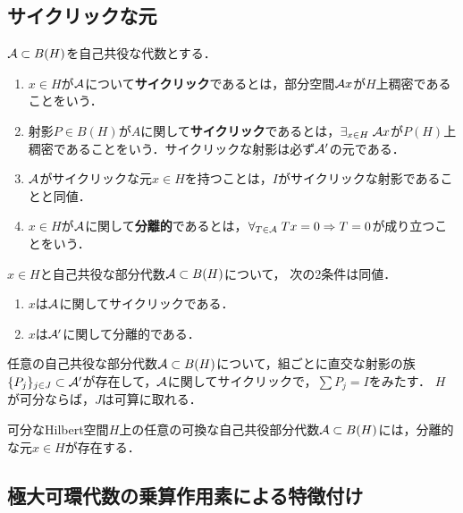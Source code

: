 \documentclass[uplatex,dvipdfmx]{jsreport}
\begin{document}
\subsection{サイクリックな元}

\begin{definition}
    $\mathcal{A}\subset B(H)$を自己共役な代数とする．
    \begin{enumerate}
        \item $x\in H$が$\mathcal{A}$について\textbf{サイクリック}であるとは，部分空間$\mathcal{A} x$が$H$上稠密であることをいう．
        \item 射影$P\in B(H)$が$A$に関して\textbf{サイクリック}であるとは，$\exists_{x\in H}\;\mathcal{A} x$が$P(H)$上稠密であることをいう．サイクリックな射影は必ず$\mathcal{A}'$の元である．
        \item $\mathcal{A}$がサイクリックな元$x\in H$を持つことは，$I$がサイクリックな射影であることと同値．
        \item $x\in H$が$\mathcal{A}$に関して\textbf{分離的}であるとは，$\forall_{T\in\mathcal{A}}\;Tx=0\Rightarrow T=0$が成り立つことをいう．
    \end{enumerate}
\end{definition}

\begin{lemma}
    $x\in H$と自己共役な部分代数$\mathcal{A}\subset B(H)$について，
    次の2条件は同値．
    \begin{enumerate}
        \item $x$は$\mathcal{A}$に関してサイクリックである．
        \item $x$は$\mathcal{A}'$に関して分離的である．
    \end{enumerate}
\end{lemma}

\begin{lemma}
    任意の自己共役な部分代数$\mathcal{A}\subset B(H)$について，組ごとに直交な射影の族$\{P_j\}_{j\in J}\subset\mathcal{A}'$が存在して，$\mathcal{A}$に関してサイクリックで，$\sum P_j=I$をみたす．
    $H$が可分ならば，$J$は可算に取れる．
\end{lemma}

\begin{lemma}
    可分なHilbert空間$H$上の任意の可換な自己共役部分代数$\mathcal{A}\subset B(H)$には，分離的な元$x\in H$が存在する．
\end{lemma}

\subsection{極大可環代数の乗算作用素による特徴付け}
\end{document}

